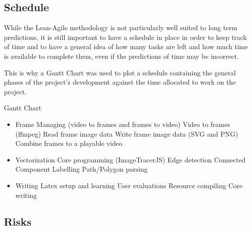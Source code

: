 \documentclass[12pt]{article}
\newcommand{\sentence}{} %
\begin{document}
    \subsection{Schedule}\label{subsec:schedule}

    \tab
    While the Lean-Agile methodology is not particularly well suited to long term predictions, it is still important
    to have a schedule in place in order to keep track of time and to have a general idea of how many tasks are left
    and how much time is available to complete them, even if the predictions of time may be incorrect.
    \sentence
    This is why a Gantt Chart was used to plot a schedule containing the general phases of the project's development
    against the time allocated to work on the project.
    \sentence
    \sentence


    \pagebreak
    \thispagestyle{empty}
    \begin{landscape}
        \begin{center}
            \huge{Gantt Chart}
            \normalsize
            \begin{itemize}
                \item Frame Managing (video to frames and frames to video)
                \subitem Video to frames (ffmpeg)
                \subitem Read frame image data
                \subitem Write frame image data (SVG and PNG)
                \subitem Combine frames to a playable video
                \item Vectorization
                \subitem Core programming (ImageTracerJS)
                \subitem Edge detection
                \subitem Connected Component Labelling
                \subitem Path/Polygon parsing
                \item Writing
                \subitem Latex setup and learning
                \subitem User evaluations
                \subitem Resource compiling
                \subitem Core writing
            \end{itemize}
        \end{center}
    \end{landscape}
    \pagebreak


    \pagebreak

    \subsection{Risks}\label{subsec:risks}
\end{document}
